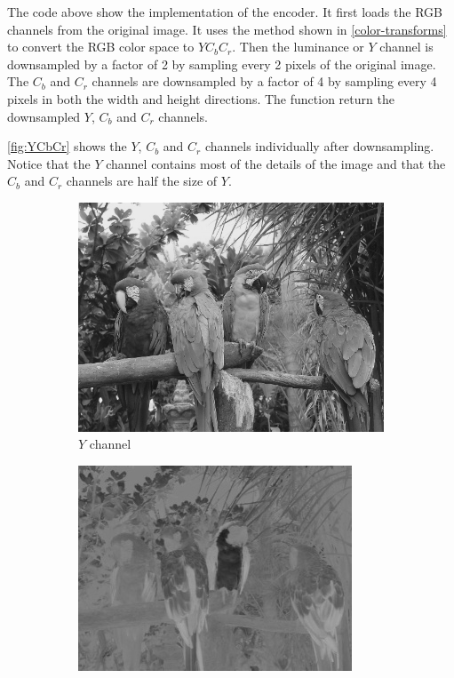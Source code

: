 \documentclass[10pt,twocolumn,letterpaper]{article}
\begin{document}
The code above show the implementation of the encoder. It first loads the RGB channels from the original image. It uses the method shown in \cref{color-transforms} to convert the RGB color space to $YC_bC_r$. Then the luminance or $Y$ channel is downsampled by a factor of 2 by sampling every 2 pixels of the original image. The $C_b$ and $C_r$ channels are downsampled by a factor of 4 by sampling every 4 pixels in both the width and height directions. The function return the downsampled $Y$, $C_b$ and $C_r$ channels.

\cref{fig:YCbCr} shows the $Y$, $C_b$ and $C_r$ channels individually after downsampling. Notice that the $Y$ channel contains most of the details of the image and that the $C_b$ and $C_r$ channels are half the size of $Y$.

\begin{figure}
    \centering
    \begin{subfigure}[b]{0.4\textwidth}
        \includegraphics[width=\textwidth]{Y.jpg}
        \caption{$Y$ channel}
        \label{fig:Y}
    \end{subfigure}
    \begin{subfigure}[b]{0.2\textwidth}
        \includegraphics[width=\textwidth]{Cb.jpg}

\end{subfigure}
\end{figure}
\end{document}
